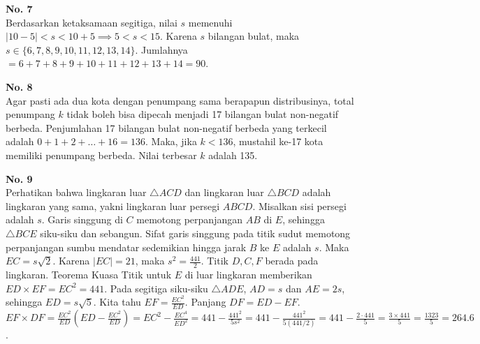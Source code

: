 \documentclass[11pt, a4paper]{article}
\begin{document}
\textbf{No. 7}\\
Berdasarkan ketaksamaan segitiga, nilai $s$ memenuhi $|10 - 5| < s < 10 + 5 \implies 5 < s < 15$.
Karena $s$ bilangan bulat, maka $s \in \{6, 7, 8, 9, 10, 11, 12, 13, 14\}$.
Jumlahnya $= 6 + 7 + 8 + 9 + 10 + 11 + 12 + 13 + 14 = 90$.

\textbf{No. 8}\\
Agar pasti ada dua kota dengan penumpang sama berapapun distribusinya, total penumpang $k$ tidak boleh bisa dipecah menjadi 17 bilangan bulat non-negatif berbeda. Penjumlahan 17 bilangan bulat non-negatif berbeda yang terkecil adalah $0 + 1 + 2 + \dots + 16 = 136$.
Maka, jika $k < 136$, mustahil ke-17 kota memiliki penumpang berbeda. Nilai terbesar $k$ adalah 135.

\textbf{No. 9}\\
Perhatikan bahwa lingkaran luar $\triangle ACD$ dan lingkaran luar $\triangle BCD$ adalah lingkaran yang sama, yakni lingkaran luar persegi $ABCD$. Misalkan sisi persegi adalah $s$. Garis singgung di $C$ memotong perpanjangan $AB$ di $E$, sehingga $\triangle BCE$ siku-siku dan sebangun. Sifat garis singgung pada titik sudut memotong perpanjangan sumbu mendatar sedemikian hingga jarak $B$ ke $E$ adalah $s$. Maka $EC = s\sqrt{2}$. Karena $|EC| = 21$, maka $s^2 = \frac{441}{2}$.
Titik $D, C, F$ berada pada lingkaran. Teorema Kuasa Titik untuk $E$ di luar lingkaran memberikan $ED \times EF = EC^2 = 441$.
Pada segitiga siku-siku $\triangle ADE$, $AD = s$ dan $AE = 2s$, sehingga $ED = s\sqrt{5}$.
Kita tahu $EF = \frac{EC^2}{ED}$. Panjang $DF = ED - EF$.
$EF \times DF = \frac{EC^2}{ED} \left( ED - \frac{EC^2}{ED} \right) = EC^2 - \frac{EC^4}{ED^2} = 441 - \frac{441^2}{5s^2} = 441 - \frac{441^2}{5(441/2)} = 441 - \frac{2 \cdot 441}{5} = \frac{3 \times 441}{5} = \frac{1323}{5} = 264.6$.

\begin{center}
\end{center}
\end{document}
